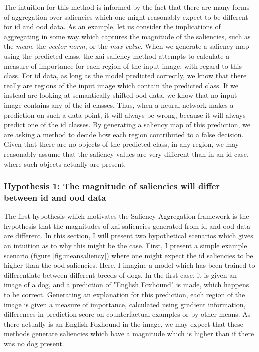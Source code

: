 \documentclass[UKenglish]{uiomasterthesis} %
\theoremstyle{definition}
\begin{document}
The intuition for this method is informed by the fact that there are many forms of aggregation over saliencies which one might reasonably expect to be different for \ac{id} and \ac{ood} data. As an example, let us consider the implications of aggregating in some way which captures the magnitude of the saliencies, such as the {\it mean}, the {\it vector norm}, or the {\it max value}. When we generate a saliency map using the predicted class, the \ac{xai} saliency method attempts to calculate a measure of importance for each region of the input image, with regard to this class. For \ac{id} data, as long as the model predicted correctly, we know that there really are regions of the input image which contain the predicted class. If we instead are looking at semantically shifted \ac{ood} data, we know that no input image contains any of the \ac{id} classes. Thus, when a neural network makes a prediction on such a data point, it will always be wrong, because it will always predict one of the \ac{id} classes. By generating a saliency map of this prediction, we are asking a method to decide how each region contributed to a false decision. Given that there are no objects of the predicted class, in any region, we may reasonably assume that the saliency values are very different than in an \ac{id} case, where such objects actually are present.

\subsubsection{Hypothesis 1: The magnitude of saliencies will differ between \ac{id} and \ac{ood} data}

The first hypothesis which motivates the Saliency Aggregation framework is the hypothesis that the magnitudes of \ac{xai} saliencies generated from \ac{id} and \ac{ood} data are different. In this section, I will present two hypothetical scenarios which gives an intuition as to why this might be the case. First, I present a simple example scenario (figure \ref{fig:meansaliency}) where one might expect the \ac{id} saliencies to be higher than the \ac{ood} saliencies. Here, I imagine a model which has been trained to differentiate between different breeds of dogs. In the first case, it is given an image of a dog, and a prediction of "English Foxhound" is made, which happens to be correct. Generating an explanation for this prediction, each region of the image is given a measure of importance, calculated using gradient information, differences in prediction score on counterfactual examples or by other means. As there actually is an English Foxhound in the image, we may expect that these methods generate saliencies which have a magnitude which is higher than if there was no dog present.
\end{document}

